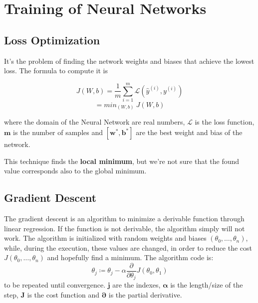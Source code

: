 \documentclass[oneside]{academica}
\begin{document}
\newpage

\section{Training of Neural Networks}

\subsection{Loss Optimization}

It's the problem of finding the network weights and biases that achieve the lowest loss. The formula to compute it is

\begin{equation*}
  J(W,b) = \frac{1}{m} \sum_{i=1}^{m} \mathcal{L}(\hat{y}^{(i)}, y^{(i)})
  \label{eq:loss optimization}
\end{equation*}
\begin{equation*}
  [w^*,b^*] = min_{(W,b)}\ J(W,b)
\end{equation*}

where the domain of the Neural Network are real numbers, $\boldsymbol{\mathcal{L}}$ is the loss function, $\boldsymbol{m}$ is the number of samples and $\boldsymbol{[w^*,b^*]}$ are the best weight and bias of the network.

This technique finds the \textbf{local minimum}, but we're not sure that the found value corresponds also to the global minimum.

\subsection{Gradient Descent}

The gradient descent is an algorithm to minimize a derivable function through linear regression. If the function is not derivable, the algorithm simply will not work.
The algorithm is initialized with random weights and biases $(\theta_0, \dots, \theta_n)$, while, during the execution, these values are changed, in order to reduce the cost $J(\theta_0, \dots, \theta_n)$ and hopefully find a minimum.
The algorithm code is:
\begin{equation*}
  \theta_j \coloneqq \theta_j - \alpha \frac{\partial}{\partial \theta_j} J(\theta_0,\theta_1)
  \label{eq:}
\end{equation*}
to be repeated until convergence. $\boldsymbol{j}$ are the indexes, $\boldsymbol{\alpha}$ is the length/size of the step, $\boldsymbol{J}$ is the cost function and $\boldsymbol{\partial}$ is the partial derivative.
\end{document}
